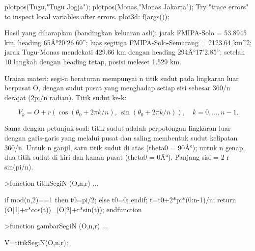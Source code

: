 \documentclass[a4paper,10pt]{article}
\begin{document}
\begin{eulernotebook}
\begin{eulercomment}
\begin{eulercomment}
\begin{eulercomment}
\begin{eulercomment}
\begin{eulercomment}
\begin{eulercomment}
\begin{eulercomment}
\begin{eulercomment}
\begin{eulercomment}
\begin{eulercomment}
\begin{eulercomment}
\begin{eulercomment}
\begin{eulercomment}
\begin{eulercomment}
\begin{eulercomment}
\begin{eulercomment}
\begin{eulercomment}
\begin{eulercomment}
\begin{euleroutput}
      plotpos(Tugu,"Tugu Jogja"); plotpos(Monas,"Monas Jakarta");
  Try "trace errors" to inspect local variables after errors.
  plot3d:
      f(args());
\end{euleroutput}
\begin{eulercomment}
Hasil yang diharapkan (bandingkan keluaran asli): jarak FMIPA-Solo = 53.8945 km, heading 65Â°20'26.60'';
luas segitiga FMIPA-Solo-Semarang = 2123.64 km\textasciicircum{}2; jarak Tugu-Monas mendekati 429.66 km dengan
heading 294Â°17'2.85''; setelah 10 langkah dengan heading tetap, posisi meleset 1.529 km.

\begin{eulercomment}
\begin{eulercomment}
\end{eulercomment}
\begin{eulercomment}
Uraian materi: segi-n beraturan mempunyai n titik sudut pada lingkaran luar berpusat O, dengan
sudut pusat yang menghadap setiap sisi sebesar 360/n derajat (2pi/n radian). Titik sudut ke-k:
\end{eulercomment}
\begin{eulerformula}
\[
V_k = O + r(\cos(\theta_0 + 2\pi k/n),\ \sin(\theta_0 + 2\pi k/n)),\quad k=0,\dots,n-1.
\]
\end{eulerformula}
\begin{eulercomment}
Sama dengan petunjuk soal: titik sudut adalah perpotongan lingkaran luar dengan garis-garis
yang melalui pusat dan saling membentuk sudut kelipatan 360/n. Untuk n ganjil, satu titik sudut
di atas (theta0 = 90Â°); untuk n genap, dua titik sudut di kiri dan kanan pusat (theta0 = 0Â°).
Panjang sisi = 2 r sin(pi/n).
\end{eulercomment}
\begin{eulerprompt}
>function titikSegiN (O,n,r) ...
\end{eulerprompt}
\begin{eulerudf}
    if mod(n,2)==1 then t0=pi/2; else t0=0; endif;
    t=t0+2*pi*(0:n-1)/n;
    return (O[1]+r*cos(t))_(O[2]+r*sin(t));
  endfunction
\end{eulerudf}
\begin{eulerprompt}
>function gambarSegiN (O,n,r) ...
\end{eulerprompt}
\begin{eulerudf}
    V=titikSegiN(O,n,r);

\end{eulerudf}
\end{eulercomment}
\end{eulercomment}
\end{eulercomment}
\end{eulercomment}
\end{eulercomment}
\end{eulercomment}
\end{eulercomment}
\end{eulercomment}
\end{eulercomment}
\end{eulercomment}
\end{eulercomment}
\end{eulercomment}
\end{eulercomment}
\end{eulercomment}
\end{eulercomment}
\end{eulercomment}
\end{eulercomment}
\end{eulercomment}
\end{eulercomment}
\end{eulercomment}
\end{eulernotebook}
\end{document}
